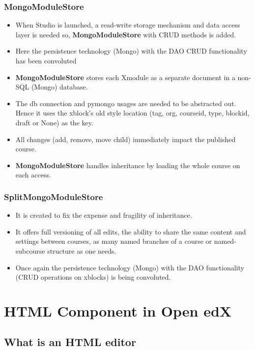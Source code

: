 \subsection{MongoModuleStore}
\begin{itemize}
	\item When Studio is launched, a read-write storage mechanism and data access layer is needed
so, \textbf{MongoModuleStore} with CRUD methods is added.
	\item Here the persistence technology (Mongo) with the DAO CRUD functionality has been
convoluted
	\item \textbf{MongoModuleStore} stores each Xmodule as a separate document in a non-SQL (Mongo)
database.
	\item The db connection and pymongo usages are needed to be abstracted out. Hence it uses the
xblock's old style location (tag, org, courseid, type, blockid, draft or None) as the key.
	\item All changes (add, remove, move child) immediately impact the published course.
	\item \textbf{MongoModuleStore} handles inheritance by loading the whole course on each access.
\end{itemize}

\subsection{SplitMongoModuleStore}
\begin{itemize}
	\item It is created to fix the expense and fragility of inheritance.
	\item It offers full versioning of all edits, the ability to share the same content and settings between
courses, as many named branches of a course or named-subcourse structure as one needs.
	\item Once again the persistence technology (Mongo) with the DAO functionality (CRUD operations
on xblocks) is being convoluted.
\end{itemize}



\chapter{HTML Component in Open edX}

\section{What is an HTML editor}

